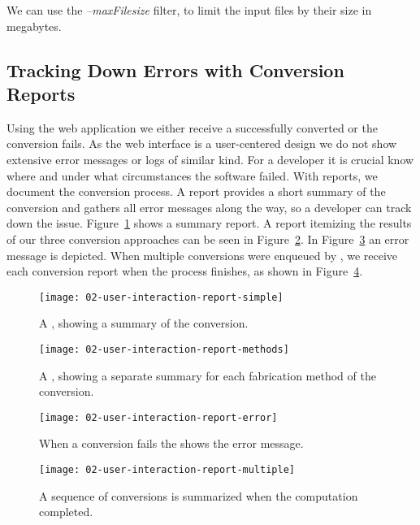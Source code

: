 \documentclass[../ClassicThesis.tex]{subfiles}
\begin{document}
We can use the \emph{--maxFilesize} filter, to limit the
input files by their size in megabytes.

\subsection{Tracking Down Errors with Conversion Reports}
\label{sec:walkthrough-cli-reports}

Using the web application we either receive a successfully converted
{\svgfile} or the conversion fails. As the web interface is a
user-centered design we do not show extensive error messages or logs
of similar kind. For a developer it is crucial know where and under what
circumstances the software failed. With reports, we document the
conversion process. A report provides a short summary of the
conversion and gathers all error messages along the way, so a
developer can track down the issue. Figure~\ref{fig:report-simple}
shows a summary report. A report itemizing the results of our three
conversion approaches can be seen in Figure~\ref{fig:report-methods}.
In Figure~\ref{fig:report-error} an error message is depicted. When
multiple conversions were enqueued by {\platener}, we receive each
conversion report when the process finishes, as shown in
Figure~\ref{fig:report-multiple}.

\begin{figure}
  \centering
  \texttt{[image: 02-user-interaction-report-simple]}
  \caption{A , showing a summary of the conversion.}
  \label{fig:report-simple}
\end{figure}

\begin{figure}
  \centering
  \texttt{[image: 02-user-interaction-report-methods]}
  \caption{A , showing a separate summary for each
    fabrication method of the conversion.}
  \label{fig:report-methods}
\end{figure}

\begin{figure}
  \centering
  \texttt{[image: 02-user-interaction-report-error]}
  \caption{When a conversion fails the  shows the error
    message.}
  \label{fig:report-error}
\end{figure}

\begin{figure}
  \centering
  \texttt{[image: 02-user-interaction-report-multiple]}
  \caption{A sequence of conversions is summarized when the
    computation completed.}
  \label{fig:report-multiple}
\end{figure}
\end{document}

